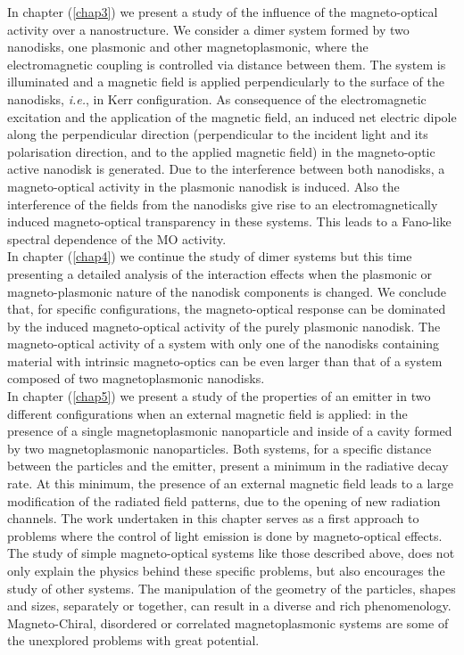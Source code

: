 In chapter (\ref{chap3}) we present a study of the influence of the magneto-optical activity over a nanostructure. We consider a dimer system formed by two nanodisks, one plasmonic and other magnetoplasmonic, where the electromagnetic coupling is controlled via distance between them. The system is illuminated and a magnetic field is applied perpendicularly to the surface of the nanodisks, \textit{i.e.}, in Kerr configuration.
 As consequence of the electromagnetic excitation and the application of the magnetic field, an induced net electric dipole along the perpendicular direction (perpendicular to the incident light and its polarisation direction, and to the applied magnetic field) in the magneto-optic active nanodisk is generated. Due to the interference between both nanodisks, a magneto-optical activity in the plasmonic nanodisk is induced. Also the interference of the fields from the nanodisks give rise to an electromagnetically induced magneto-optical transparency in these systems. This leads to a Fano-like spectral dependence of the MO activity.\\
In chapter (\ref{chap4}) we continue the study of dimer systems but this time presenting a detailed analysis of the interaction effects when the plasmonic or magneto-plasmonic nature of the nanodisk components is changed. We conclude that, for specific configurations, the magneto-optical response can be dominated by the induced magneto-optical activity of the purely plasmonic nanodisk. The magneto-optical activity of a system with only one of the nanodisks containing material with intrinsic magneto-optics can be even larger than that of a system composed of two magnetoplasmonic nanodisks.\\
In chapter (\ref{chap5}) we present a study of the properties of an emitter in two different configurations when an external magnetic field is applied: in the presence of a single magnetoplasmonic nanoparticle and inside of a cavity formed by two magnetoplasmonic nanoparticles. Both systems, for a specific distance between the particles and the emitter, present a minimum in the radiative decay rate.
At this minimum, the presence of an external magnetic field leads to a large modification of the radiated field patterns, due to the opening of new radiation channels. The work undertaken in this chapter serves as a first approach to problems where the control of light emission is done by magneto-optical effects. \\
The study of simple magneto-optical systems like those described above, does not only explain the physics behind these specific problems, but also encourages the study of other systems. The manipulation of the geometry of the particles, shapes and sizes, separately or together, can result in a diverse and rich phenomenology. Magneto-Chiral, disordered or correlated magnetoplasmonic systems are some of the unexplored problems with great potential.

